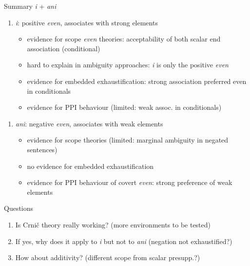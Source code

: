 \documentclass[ignorenonframetext,]{beamer}
\providecommand{\tightlist}{%
  \setlength{\itemsep}{0pt}\setlength{\parskip}{0pt}}
\begin{document}
\begin{frame}{Summary \emph{i} + \emph{ani}}

\begin{enumerate}
\def\labelenumi{\arabic{enumi})}
\tightlist
\item
  \emph{i}: positive \emph{even}, associates with strong elements

  \begin{itemize}
  \tightlist
  \item
    evidence for scope \emph{even} theories: acceptability of both
    scalar end association (conditional)
  \item
    hard to explain in ambiguity approaches: \emph{i} is only the
    positive \emph{even}
  \item
    evidence for embedded exhaustification: strong association preferred
    even in conditionals
  \item
    evidence for PPI behaviour (limited: weak assoc. in conditionals)
  \end{itemize}
\end{enumerate}

\end{frame}

\begin{frame}

\begin{enumerate}
\def\labelenumi{\arabic{enumi})}
\setcounter{enumi}{1}
\tightlist
\item
  \emph{ani}: negative \emph{even}, associates with weak elements

  \begin{itemize}
  \tightlist
  \item
    evidence for scope theories (limited: marginal ambiguity in negated
    sentences)
  \item
    no evidence for embedded exhaustification
  \item
    evidence for PPI behaviour of covert \emph{even}: strong preference
    of weak elements
  \end{itemize}
\end{enumerate}

\end{frame}

\begin{frame}{Questions}

\begin{enumerate}
\def\labelenumi{\arabic{enumi})}
\item
  Is Crnič theory really working? (more environments to be tested)
\item
  If yes, why does it apply to \emph{i} but not to \emph{ani} (negation
  not exhaustified?)
\item
  How about additivity? (different scope from scalar presupp.?)
\end{enumerate}

\end{frame}
\end{document}
